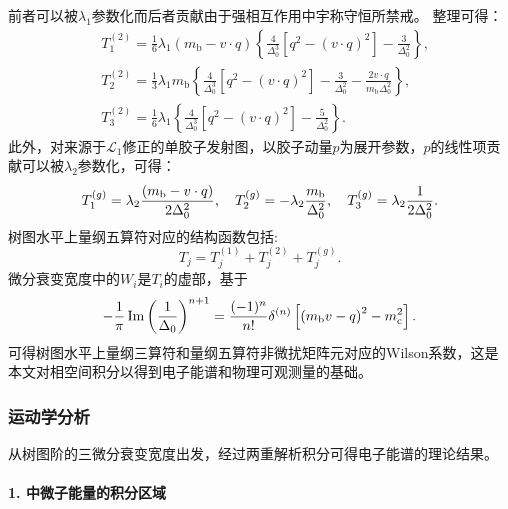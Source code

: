 前者可以被$\lambda_1$参数化而后者贡献由于强相互作用中宇称守恒所禁戒。
整理可得：
\begin{equation}
    \begin{aligned}
    & T_1^{(2)}=\frac{1}{6} \lambda_1\left(m_{\mathrm{b}}-v \cdot q\right)\left\{\frac{4}{\Delta_0^3}\left[q^2-(v \cdot q)^2\right]-\frac{3}{\Delta_0^2}\right\}, \\
    & T_2^{(2)}=\frac{1}{3} \lambda_1 m_{\mathrm{b}}\left\{\frac{4}{\Delta_0^3}\left[q^2-(v \cdot q)^2\right]-\frac{3}{\Delta_0^2}-\frac{2 v \cdot q}{m_{\mathrm{b}} \Delta_0^2}\right\}, \\
    & T_3^{(2)}=\frac{1}{6} \lambda_1\left\{\frac{4}{\Delta_0^3}\left[q^2-(v \cdot q)^2\right]-\frac{5}{\Delta_0^2}\right\}.
    \end{aligned}
\end{equation}
此外，对来源于$ \mathcal{L}_1$修正的单胶子发射图，以胶子动量$p$为展开参数，$p$的线性项贡献可以被$\lambda_{2}$参数化，可得：
\begin{equation}
     T_1^{(g)}=\lambda_2 \frac{\left(m_{\mathrm{b}}-v \cdot q\right)}{2 \Delta_0^2},\quad
     T_2^{(g)}=-\lambda_2 \frac{m_{\mathrm{b}}}{\Delta_0^2}, \quad
     T_3^{(g)}=\lambda_2 \frac{1}{2 \Delta_0^2}.
    \end{equation}
树图水平上量纲五算符对应的结构函数包括:
$$
T_j=T_j^{(1)}+T_j^{(2)}+T_j^{(g)}.
$$
微分衰变宽度中的$W_{i}$是$T_{i}$的虚部，基于$$
-\frac{1}{\pi} \operatorname{Im}\left(\frac{1}{\Delta_0}\right)^{n+1}=\frac{(-1)^n}{n!} \delta^{(n)}\left[\left(m_{\mathrm{b}} v-q\right)^2-m_{\mathrm{c}}^2\right].
$$
可得树图水平上量纲三算符和量纲五算符非微扰矩阵元对应的Wilson系数，这是本文对相空间积分以得到电子能谱和物理可观测量的基础。

\subsubsection{运动学分析}
从树图阶的三微分衰变宽度出发，经过两重解析积分可得电子能谱的理论结果。
\paragraph{1. 中微子能量的积分区域}


